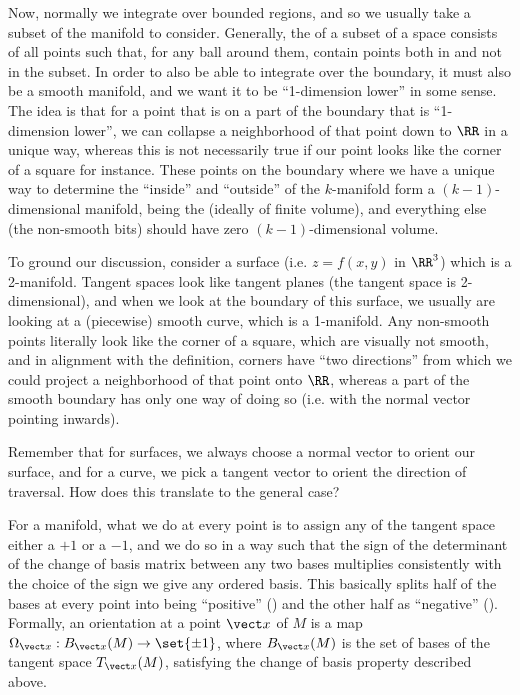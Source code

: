 \documentclass[12pt]{article}
\begin{document}
    Now, normally we integrate over bounded regions, and so we usually take a
    subset of the manifold to consider. Generally, the  of a
    subset of a space consists of all points such that, for any ball around
    them, contain points both in and not in the subset. In order to also be able
    to integrate over the boundary, it must also be a smooth manifold, and we
    want it to be ``1-dimension lower'' in some sense. The idea is that for a
    point that is on a part of the boundary that is ``1-dimension lower'', we
    can collapse a neighborhood of that point down to $\RR$ in a unique
    way, whereas this is not necessarily true if our point looks like the corner
    of a square for instance. These points on the boundary where we have a
    unique way to determine the ``inside'' and ``outside'' of the $k$-manifold
    form a $(k-1)$-dimensional manifold, being the  (ideally of
    finite volume), and
    everything else (the non-smooth bits) should have zero $(k-1)$-dimensional
    volume. 

    To ground our discussion, consider a surface (i.e. $z = f(x,
    y)$ in $\RR^3$) which is a 2-manifold. Tangent spaces look like tangent
    planes (the tangent space is 2-dimensional), and when we look at the
    boundary of this surface, we usually are looking at a (piecewise) smooth
    curve, which is a 1-manifold. Any non-smooth points literally look like the
    corner of a square, which are visually not smooth, and in alignment with the
    definition, corners have ``two directions'' from which we could project a
    neighborhood of that point onto $\RR$, whereas a part of the smooth boundary
    has only one way of doing so (i.e. with the normal vector pointing inwards).  
    
  \noindent {} Remember that
  for surfaces, we always choose a normal vector to orient our surface, and for
  a curve, we pick a tangent vector to orient the direction of traversal. How
  does this translate to the general case? 

  For a manifold, what we do at every point is to assign any  of the tangent space either a $+1$ or a $-1$, and we do so in a way
  such that the sign of the determinant of the change of basis matrix between any two
  bases multiplies consistently with the choice of the sign we give any ordered
  basis. This basically splits half of the bases at every point into being
  ``positive'' () and the other half as ``negative''
  (). Formally, an orientation at a point $\vect x$ of $M$
  is a map $\Omega_{\vect x} : B_{\vect x}(M) \to \set{\pm 1}$,
  where $B_{\vect x}(M)$ is the set of bases of the tangent space $T_{\vect x}(M)$,
  satisfying the change of basis property described above.
\end{document}
